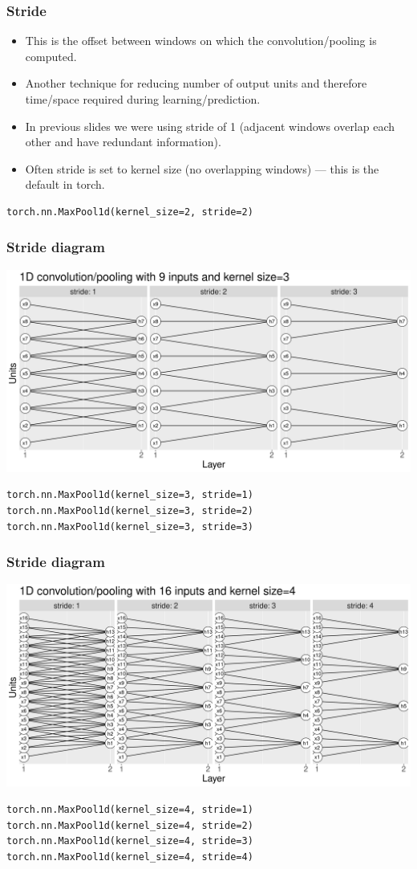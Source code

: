 \documentclass{beamer}
\begin{document}
\begin{frame}[fragile]
  \frametitle{Stride}
  \begin{itemize}
  \item This is the offset between windows on which the
    convolution/pooling is computed.
  \item Another technique for reducing number of output units and
    therefore time/space required during learning/prediction.
  \item In previous slides we were using stride of 1 (adjacent windows
    overlap each other and have redundant information).
  \item Often stride is set to kernel size (no overlapping windows)
    --- this is the default in torch.
  \end{itemize} 
\begin{verbatim}
torch.nn.MaxPool1d(kernel_size=2, stride=2)
\end{verbatim}
\end{frame}

\begin{frame}[fragile]
  \frametitle{Stride diagram}
  \includegraphics[width=\textwidth]{figure-pooling-9-3}
\begin{verbatim}
torch.nn.MaxPool1d(kernel_size=3, stride=1)
torch.nn.MaxPool1d(kernel_size=3, stride=2)
torch.nn.MaxPool1d(kernel_size=3, stride=3)
\end{verbatim}
\end{frame}

\begin{frame}[fragile]
  \frametitle{Stride diagram}
  \includegraphics[width=\textwidth]{figure-pooling-16-4}
\begin{verbatim}
torch.nn.MaxPool1d(kernel_size=4, stride=1)
torch.nn.MaxPool1d(kernel_size=4, stride=2)
torch.nn.MaxPool1d(kernel_size=4, stride=3)
torch.nn.MaxPool1d(kernel_size=4, stride=4)
\end{verbatim}
\end{frame}
\end{document}
